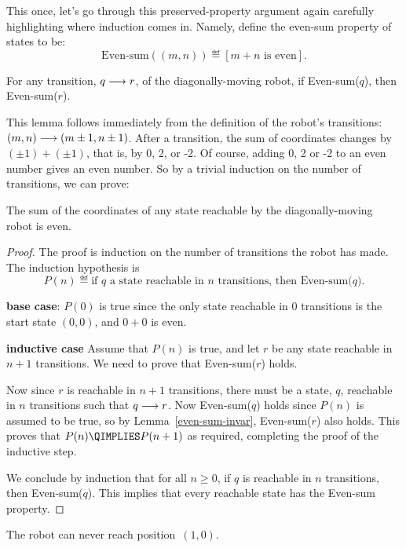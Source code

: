 This once, let's go through this preserved-property argument again
carefully highlighting where induction comes in.  Namely, define the
even-sum property of states to be:
\[
\text{Even-sum}((m,n)) \eqdef [m+n \text{ is even}].
\]
\begin{lemma}\label{even-sum-invar}
For any transition, $q \mathrel{\longrightarrow} r$, of the diagonally-moving robot, if
Even-sum($q$), then Even-sum($r$).
\end{lemma}
This lemma follows immediately from the definition of the robot's
transitions: $(m,n)\mathrel{\longrightarrow} (m\pm 1, n\pm 1)$.  After a transition,
the sum of coordinates changes by $(\pm 1) + (\pm 1)$, that is, by 0,
2, or -2.  Of course, adding 0, 2 or -2 to an even number gives an
even number.  So by a trivial induction on the number of transitions,
we can prove:
\begin{theorem}\label{th:diag-robot}
The sum of the coordinates of any state reachable by the
diagonally-moving robot is even.
\end{theorem}

\begin{proof}
The proof is induction on the number of transitions the robot has
made.  The induction hypothesis is
\[
P(n) \eqdef \text{if $q$ a state reachable in $n$ transitions, then
  Even-sum($q$)}.
\]

\textbf{base case}: $P(0)$ is true since the only state reachable in 0
transitions is the start state $(0, 0)$, and $0 + 0$ is even.

\textbf{inductive case} Assume that $P(n)$ is true, and let $r$ be any
state reachable in $n+1$ transitions. We need to prove that
Even-sum($r$) holds.

Now since $r$ is reachable in $n+1$ transitions, there must be a
state, $q$, reachable in $n$ transitions such that $q \mathrel{\longrightarrow} r$.  Now
Even-sum($q$) holds since $P(n)$ is assumed to be true, so by
Lemma~\ref{even-sum-invar}, Even-sum($r$) also holds.  This proves
that $P(n) \QIMPLIES P(n + 1)$ as required, completing the proof of
the inductive step.

We conclude by induction that for all $n \ge 0$, if $q$ is reachable
in $n$ transitions, then Even-sum($q$).  This implies that every
reachable state has the Even-sum property.

\end{proof}

\begin{corollary}\label{cor:diag-robot}
The robot can never reach position~$(1, 0)$.
\end{corollary}

